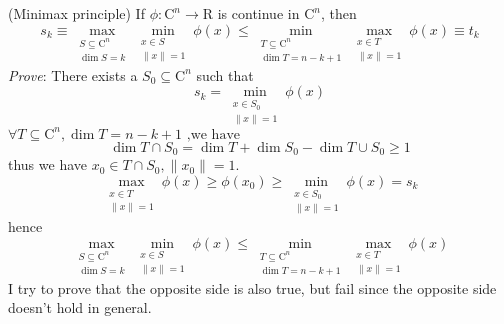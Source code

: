 \documentclass[a4paper,12pt]{article}
\begin{document}
(Minimax principle) If $\phi \colon \mathrm{C}^n \to \mathrm{R}$ is continue in $\mathrm{C}^n$, then
\[ s_k \equiv \max_{\begin{matrix} S \subseteq \mathrm{C}^n \\ \dim S = k \end{matrix} } \min_{\begin{matrix} x \in S \\ \|x\|=1 \end{matrix} } \phi(x) \leq
\min_{\begin{matrix} T \subseteq \mathrm{C}^n \\ \dim T = n-k+1 \end{matrix}} \max_{\begin{matrix} x \in T \\ \|x\|=1 \end{matrix} } \phi(x) \equiv t_k \]
\textit{Prove}:
There exists a $S_0 \subseteq \mathrm{C}^n$ such that
\[ s_k = \min_{\begin{matrix} x \in S_0 \\ \|x\|=1 \end{matrix} } \phi(x) \]
$ \forall T \subseteq \mathrm{C}^n,\dim{T}=n-k+1 \mbox{ ,we have} $
\[ \dim{T \cap S_0} = \dim{T}+\dim{S_0}-\dim{T \cup S_0} \geq 1\]
thus we have $x_0 \in T \cap S_0 , \|x_0\| = 1 $.
\[ \max_{\begin{matrix} x \in T \\ \|x\|=1 \end{matrix} } \phi(x) \geq \phi(x_0) \geq \min_{\begin{matrix} x \in S_0 \\ \|x\|=1 \end{matrix} } \phi(x) = s_k \] 
hence
\[ \max_{\begin{matrix} S \subseteq \mathrm{C}^n \\ \dim S = k \end{matrix} } \min_{\begin{matrix} x \in S \\ \|x\|=1 \end{matrix} } \phi(x) \leq
\min_{\begin{matrix} T \subseteq \mathrm{C}^n \\ \dim T = n-k+1 \end{matrix}} \max_{\begin{matrix} x \in T \\ \|x\|=1 \end{matrix} } \phi(x) \] 
I try to prove that the opposite side is also true, but fail since the opposite side doesn't hold in general. 
\end{document}
